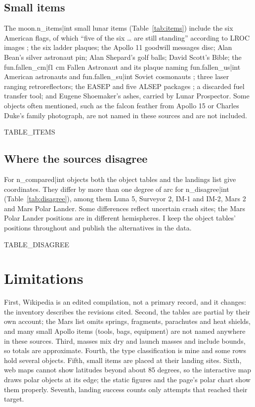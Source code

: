 \documentclass[11pt,a4paper]{article}
\begin{document}
\subsection{Small items}
The {{moon.n_items|int}} small lunar items (Table~\ref{tab:items}) include the six American flags, of which ``five of the six \ldots{} are still standing'' according to LROC images \citep{wikimoonlanding}; the six ladder plaques; the Apollo 11 goodwill messages disc; Alan Bean's silver astronaut pin; Alan Shepard's golf balls; David Scott's Bible; the {{fun.fallen_cm|f1}} cm Fallen Astronaut and its plaque naming {{fun.fallen_us|int}} American astronauts and {{fun.fallen_su|int}} Soviet cosmonauts \citep{wikifallen}; three laser ranging retroreflectors; the EASEP and five ALSEP packages \citep{wikialsep}; a discarded fuel transfer tool; and Eugene Shoemaker's ashes, carried by Lunar Prospector. Some objects often mentioned, such as the falcon feather from Apollo 15 or Charles Duke's family photograph, are not named in these sources and are not included.

{{TABLE_ITEMS}}

\subsection{Where the sources disagree}
For {{n_compared|int}} objects both the object tables and the landings list give coordinates. They differ by more than one degree of arc for {{n_disagree|int}} (Table~\ref{tab:disagree}), among them Luna 5, Surveyor 2, IM-1 and IM-2, Mars 2 and Mars Polar Lander. Some differences reflect uncertain crash sites; the Mars Polar Lander positions are in different hemispheres. I keep the object tables' positions throughout and publish the alternatives in the data.

{{TABLE_DISAGREE}}

\section{Limitations}
First, Wikipedia is an edited compilation, not a primary record, and it changes: the inventory describes the revisions cited. Second, the tables are partial by their own account; the Mars list omits springs, fragments, parachutes and heat shields, and many small Apollo items (tools, bags, equipment) are not named anywhere in these sources. Third, masses mix dry and launch masses and include bounds, so totals are approximate. Fourth, the type classification is mine and some rows hold several objects. Fifth, small items are placed at their landing sites. Sixth, web maps cannot show latitudes beyond about 85 degrees, so the interactive map draws polar objects at its edge; the static figures and the page's polar chart show them properly. Seventh, landing success counts only attempts that reached their target.
\end{document}
